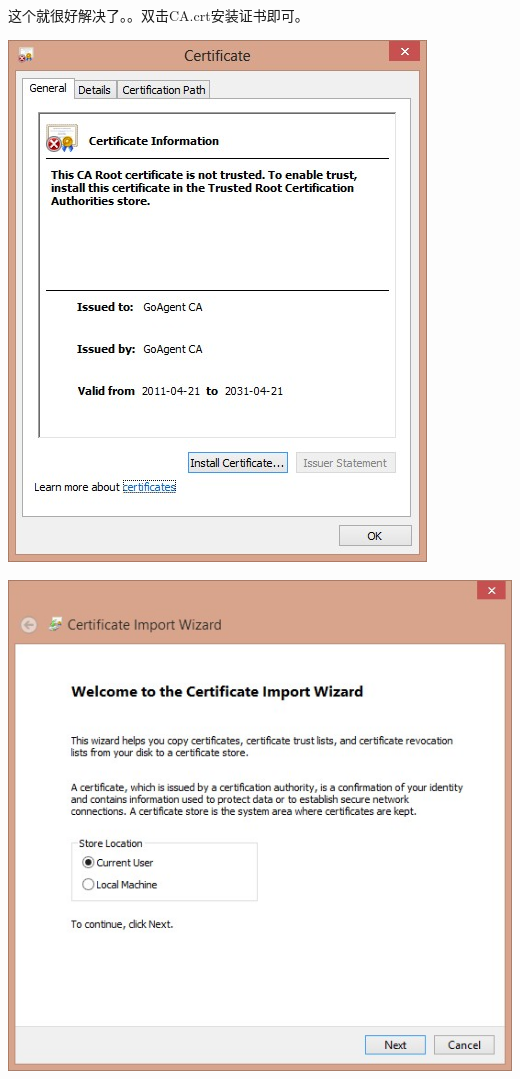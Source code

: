 \documentclass[12pt,a4paper,landscape]{article}
\begin{document}
\begin{CJK}{UTF8}{gbsn}
\newpage

这个就很好解决了。。双击CA.crt安装证书即可。


\includegraphics[scale=1]{pic/003.jpg}

\includegraphics[scale=1]{pic/004.jpg}


\end{CJK}
\end{document}

